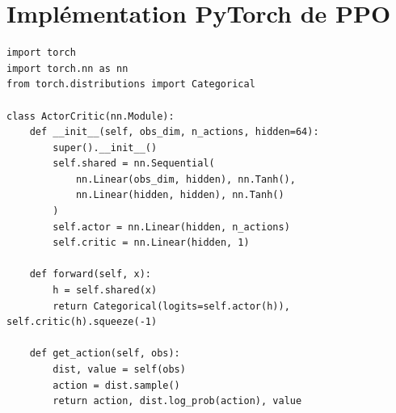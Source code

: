 \section{Impl\'ementation PyTorch de PPO}

\begin{codeblock}[title=\textbf{PPO --- R\'eseau acteur-critique}]
\begin{verbatim}
import torch
import torch.nn as nn
from torch.distributions import Categorical

class ActorCritic(nn.Module):
    def __init__(self, obs_dim, n_actions, hidden=64):
        super().__init__()
        self.shared = nn.Sequential(
            nn.Linear(obs_dim, hidden), nn.Tanh(),
            nn.Linear(hidden, hidden), nn.Tanh()
        )
        self.actor = nn.Linear(hidden, n_actions)
        self.critic = nn.Linear(hidden, 1)

    def forward(self, x):
        h = self.shared(x)
        return Categorical(logits=self.actor(h)), self.critic(h).squeeze(-1)

    def get_action(self, obs):
        dist, value = self(obs)
        action = dist.sample()
        return action, dist.log_prob(action), value
\end{verbatim}
\end{codeblock}

